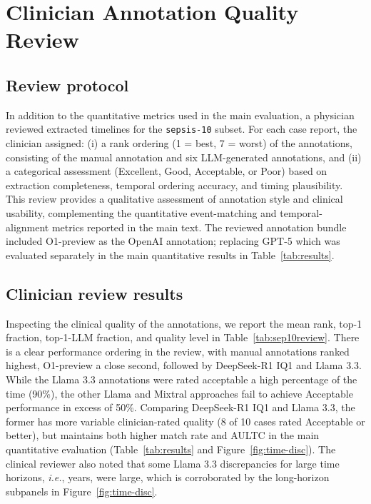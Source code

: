 \documentclass[pmlr,twocolumn,10pt]{jmlr} %
\begin{document}
\clearpage

\section{Clinician Annotation Quality Review}
\label{apd:clinician_quality_review}

\subsection{Review protocol}

In addition to the quantitative metrics used in the main evaluation, a physician reviewed extracted timelines for the \texttt{sepsis-10} subset.
For each case report, the clinician assigned: (i) a rank ordering (1 = best, 7 = worst) of the annotations, consisting of the manual annotation and six LLM-generated annotations, and (ii) a categorical assessment (Excellent, Good, Acceptable, or Poor) based on extraction completeness, temporal ordering accuracy, and timing plausibility.
This review provides a qualitative assessment of annotation style and clinical usability, complementing the quantitative event-matching and temporal-alignment metrics reported in the main text.
The reviewed annotation bundle included O1-preview as the OpenAI annotation; replacing GPT-5 which was evaluated separately in the main quantitative results in Table~\ref{tab:results}.

\subsection{Clinician review results}

Inspecting the clinical quality of the annotations, we report the mean rank, top-1 fraction, top-1-LLM fraction, and quality level in Table~\ref{tab:sep10review}.
There is a clear performance ordering in the review, with manual annotations ranked highest, O1-preview a close second, followed by DeepSeek-R1 IQ1 and Llama 3.3.
While the Llama 3.3 annotations were rated acceptable a high percentage of the time (90\%), the other Llama and Mixtral approaches fail to achieve Acceptable performance in excess of 50\%.
Comparing DeepSeek-R1 IQ1 and Llama 3.3, the former has more variable clinician-rated quality (8 of 10 cases rated Acceptable or better), but maintains both higher match rate and AULTC in the main quantitative evaluation (Table~\ref{tab:results} and Figure~\ref{fig:time-disc}).
The clinical reviewer also noted that some Llama 3.3 discrepancies for large time horizons, \emph{i.e.}, years, were large, which is corroborated by the long-horizon subpanels in Figure~\ref{fig:time-disc}.
\end{document}
